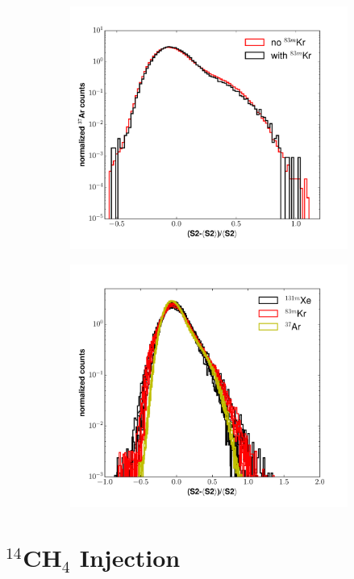 \begin{figure}[h!]
\centering
\begin{subfigure}{0.5\textwidth}
  \centering
  \includegraphics[width=\textwidth]{Figures/S2_tail_spec_Ar_rate.pdf}
  \caption{}
\end{subfigure}%
\centering
\begin{subfigure}{0.5\textwidth}
  \centering
  \includegraphics[width=\textwidth]{Figures/S2_tail_spec_all.pdf}
  \caption{}
\end{subfigure}
\caption{}
\label{fig:S2_tail_specl} 
\end{figure}


\section{$^{14}$CH$_4$ Injection}






